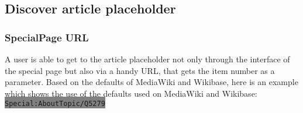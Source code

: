 \subsection{Discover article placeholder}
\subsubsection{SpecialPage URL}
A user is able to get to the article placeholder not only through the interface of the special page but also via a handy URL, that gets the item number as a parameter. Based on the defaults of MediaWiki and Wikibase, here is an example which shows the use of the defaults used on MediaWiki and Wikibase: \colorbox{Gray}{\lstinline[basicstyle=\ttfamily\color{white}]|Special:AboutTopic/Q5279|} \\

